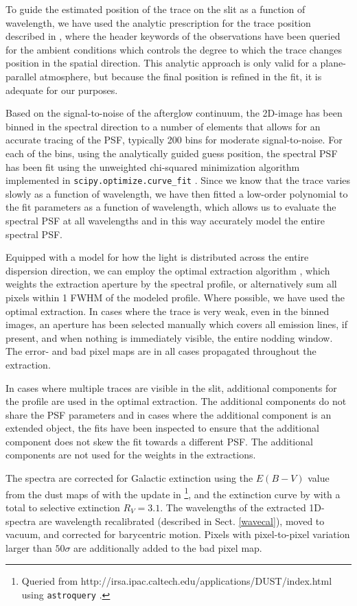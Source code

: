 \documentclass{aa}    %
\begin{document}
To guide the estimated position of the trace on the slit as a function of
wavelength, we have used the analytic prescription for the trace position
described in \citet{Filippenko1982}, where the header keywords of the
observations have been queried for the ambient conditions which controls the
degree to which the trace changes position in the spatial direction. This
analytic approach is only valid for a plane-parallel atmosphere, but because the
final position is refined in the fit, it is adequate for our purposes.

Based on the signal-to-noise of the afterglow continuum, the 2D-image has been
binned in the spectral direction to a number of elements that allows for an
accurate tracing of the PSF, typically 200 bins for moderate signal-to-noise.
For each of the bins, using the analytically guided guess position, the spectral
PSF has been fit using the unweighted chi-squared minimization algorithm
implemented in \texttt{scipy.optimize.curve\_fit} \citep{scipy}. Since we know
that the trace varies slowly as a function of wavelength, we have then fitted a
low-order polynomial to the fit parameters as a function of wavelength, which
allows us to evaluate the spectral PSF at all wavelengths and in this way
accurately model the entire spectral PSF.

Equipped with a model for how the light is distributed across the entire
dispersion direction, we can  employ the optimal extraction algorithm
\citep{Horne1986}, which weights the extraction aperture by the spectral profile,
or alternatively sum all pixels within 1 FWHM of the modeled profile. Where
possible, we have used the optimal extraction. In cases where the trace is very
weak, even in the binned images, an aperture has been selected manually which
covers all emission lines, if present, and when nothing is immediately visible, the
entire nodding window. The error- and bad pixel maps are in all cases propagated
throughout the extraction.

In cases where multiple traces are visible in the slit, additional components
for the profile are used in the optimal extraction. The additional components do
not share the PSF parameters and in cases where the additional component is an
extended object, the fits have been inspected to ensure that the additional
component does not skew the fit towards a different PSF. The additional
components are not used for the weights in the extractions.

The spectra are corrected for Galactic extinction using the $E(B-V)$ value from
the dust maps of \citet{Schlegel1998} with the update in
\citet{Schlafly2011}\footnote{Queried from
	http://irsa.ipac.caltech.edu/applications/DUST/index.html using
	\texttt{astroquery} \citep{astroquery}.}, and the extinction curve by
\cite{Cardelli1989} with a total to selective extinction $R_V = 3.1$. The
wavelengths of the extracted 1D-spectra are wavelength recalibrated (described
in Sect. \ref{wavecal}), moved to vacuum, and corrected for barycentric motion.
Pixels with pixel-to-pixel variation larger than $50 \sigma$ are additionally
added to the bad pixel map.
\end{document}
